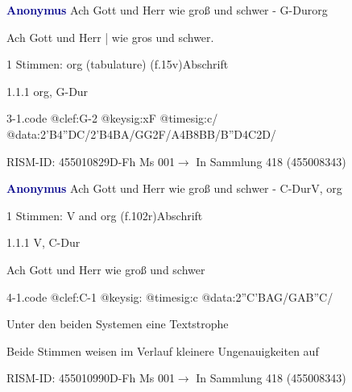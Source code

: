 \documentclass[twocolumn, 12pt]{book}
\begin{document}
\par \vspace{16pt} \textcolor{darkblue}{\textbf{Anonymus  }}\hfillplus{\textbf{[3]}}\newline Ach Gott und Herr wie groß und schwer - G-Dur\newline org
\par \begin{itshape}[f.15v, at left:] Ach Gott und Herr | wie gros und schwer.\end{itshape} 
\par \textcolor{darkblue}{}  1 Stimmen: org (tabulature)  (f.15v)\newline Abschrift
\par 1.1.1  org, G-Dur  
\begin{filecontents*}{3-1.code}
@clef:G-2
@keysig:xF
@timesig:c/
@data:2'B4''DC/2'B4BA/GG2F/A4B{8BB}/{B''D}4C2D/
\end{filecontents*}
\newline %
\par RISM-ID: 455010829\newline D-Fh  Ms 001\newline $\rightarrow$ In Sammlung 418 (455008343)
      
\par \vspace{16pt} \textcolor{darkblue}{\textbf{Anonymus  }}\hfillplus{\textbf{[4]}}\newline Ach Gott und Herr wie groß und schwer - C-Dur\newline V, org
\par \begin{itshape}\end{itshape} 
\par \textcolor{darkblue}{}  1 Stimmen: V and org  (f.102r)\newline Abschrift
\par 1.1.1  V, C-Dur\newline \begin{footnotesize} Ach Gott und Herr wie groß und schwer \end{footnotesize}  
\begin{filecontents*}{4-1.code}
@clef:C-1
@keysig:
@timesig:c
@data:2''C'BAG/GAB''C/
\end{filecontents*}
\newline %
\par Unter den beiden Systemen eine Textstrophe
\par Beide Stimmen weisen im Verlauf kleinere Ungenauigkeiten auf
\par RISM-ID: 455010990\newline D-Fh  Ms 001\newline $\rightarrow$ In Sammlung 418 (455008343)
      
\end{document}
